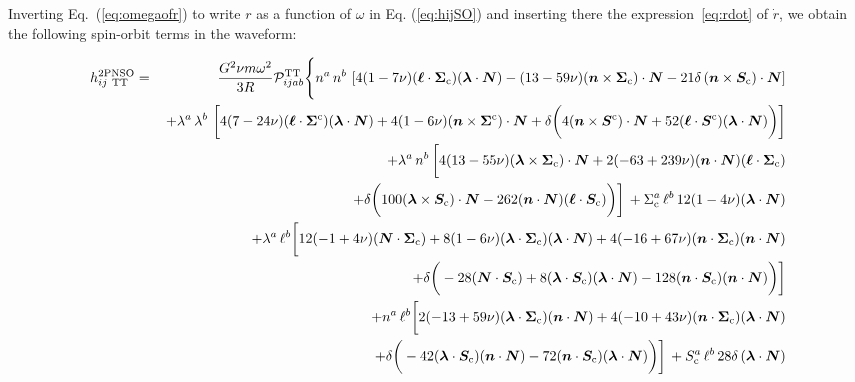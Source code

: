 \documentclass[aps, prd,
twocolumn,%
superscriptaddress,
showpacs, nofootinbib, eqsecnum, amsmath, amssymb, floatfix
]{revtex4}
\begin{document}
%
Inverting Eq.~(\ref{eq:omegaofr}) to write $r$ as a function of $\omega$ in
Eq. (\ref{eq:hijSO}) and inserting there the expression~\eqref{eq:rdot} of
$\dot{r}$, we obtain the following spin-orbit terms in the waveform:
%
\begin{widetext}
\begin{eqnarray}
\label{eq:hijSOcirc}
h_{ij\  {\rm{TT}}}^{\mathrm {2PN SO}}&=& \frac{G^2 \nu m \omega^2}{3R }{\cal
  P}_{ijab}^{\mathrm{TT}}\Bigg\{
 n^a \, n^b\, \left[
4 (1-7\nu)(\bm{\ell}\cdot \bm{\Sigma}_{\rm c})(\bm{\lambda}\cdot \bm{N})-
(13-59\nu)(\bm{n}\times \bm{\Sigma}_{\rm c})\cdot \bm{N}-
21\delta\,(\bm{n}\times \bm{S}_{\rm c})\cdot \bm{N}\right]\nonumber\\
 && \, + \lambda^a \, \lambda^b \, \left[
4(7-24\nu)(\bm{\ell}\cdot \bm{\Sigma}^{\rm c})(\bm{\lambda}\cdot \bm{N})+
4(1-6\nu)(\bm{n}\times \bm{\Sigma}^{\rm c})\cdot \bm{N}+
\delta  \bigg(4 (\bm{n}\times \bm{S}^{\rm c})\cdot \bm{N}+
52 ( \bm{\ell}\cdot \bm{S}^{\rm c})(\bm{\lambda}\cdot \bm{N})\bigg)\right]
\nonumber\\
&& \, + \lambda^{a} \, n^{b} \, \bigg[
4(13-55\nu)(\bm{\lambda}\times \bm{\Sigma}_{\rm c}) \cdot \bm{N}+
2(-63+239\nu)(\bm{n}\cdot \bm{N})(\bm{\ell}\cdot \bm{\Sigma}_{\rm c})
\nonumber\\
&& \left. \; \; \; \; \;  +
\delta \bigg(100  (\bm{\lambda}\times \bm{S}_{\rm c})\cdot \bm{N}-
262(\bm{n}\cdot \bm{N})(\bm{\ell}\cdot \bm{S}_{\rm c}) \bigg)\right] \,
+ \Sigma_{\rm c}^{a}\,  \ell^{b} \, 12 (1-4\nu) (\bm{\lambda}\cdot \bm{N})
\nonumber\\
&&+ \lambda^{a} \, {\ell}^{b}\bigg[
12(-1+4\nu)(\bm{N} \cdot \bm{\Sigma}_{\rm c})+
8(1-6\nu) (\bm{\lambda}\cdot \bm{\Sigma}_{\rm c}) (\bm{\lambda}\cdot \bm{N})+
4 (-16+67\nu) (\bm{n}\cdot \bm{\Sigma}_{\rm c}) (\bm{n}\cdot \bm{N}) \nonumber\\
&& \left. \; \; \; \; \; +\delta \bigg(
- 28(\bm{N}\cdot \bm{S}_{\rm c})+
8   (\bm{\lambda}\cdot \bm{S}_{\rm c}) (\bm{\lambda}\cdot \bm{N})-
128(\bm{n}\cdot \bm{S}_{\rm c}) (\bm{n}\cdot \bm{N})\bigg)
 \right]\nonumber\\
&&+ n^{a} \, {\ell}^{b}\bigg[
2(-13+59\nu) (\bm{\lambda}\cdot \bm{\Sigma}_{\rm c})(\bm{n}\cdot \bm{N})+
4(-10+43\nu) (\bm{n}\cdot \bm{\Sigma}_{\rm c})(\bm{\lambda}\cdot \bm{N})
\nonumber\\
&& \left. \; \; \; \; \; +
\delta \bigg(
-42 (\bm{\lambda}\cdot \bm{S}_{\rm c})(\bm{n}\cdot \bm{N})-
72 (\bm{n}\cdot \bm{S}_{\rm c})(\bm{\lambda}\cdot \bm{N})\bigg)\right]\, +
S_{\rm c}^{a}\,  \ell^{b} \, 28\delta\, (\bm{\lambda}\cdot \bm{N})

\end{eqnarray}
\end{widetext}
\end{document}
